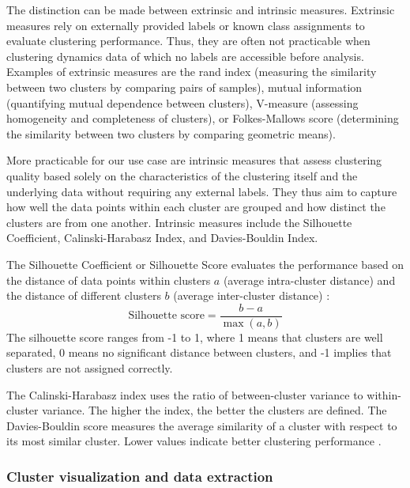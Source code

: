 \documentclass[9pt,bestpractices]{livecoms}
\begin{document}
The distinction can be made between extrinsic and intrinsic measures. Extrinsic measures rely on externally provided labels or known class assignments to evaluate clustering performance. Thus, they are often not practicable when clustering dynamics data of which no labels are accessible before analysis. Examples of extrinsic measures are the rand index (measuring the similarity between two clusters by comparing pairs of samples), mutual information (quantifying mutual dependence between clusters), V-measure (assessing homogeneity and completeness of clusters), or Folkes-Mallows score (determining the similarity between two clusters by comparing geometric means).

More practicable for our use case are intrinsic measures that assess clustering quality based solely on the characteristics of the clustering itself and the underlying data without requiring any external labels. They thus aim to capture how well the data points within each cluster are grouped and how distinct the clusters are from one another. Intrinsic measures include the Silhouette Coefficient, Calinski-Harabasz Index, and Davies-Bouldin Index.

The Silhouette Coefficient or Silhouette Score evaluates the performance based on the distance of data points within clusters $a$ (average intra-cluster distance) and the distance of different clusters $b$ (average inter-cluster distance) \cite{ROUSSEEUW198753}:
\begin{equation}
\label{eq:silhouette}
\text{Silhouette score} =  \frac{b-a}{\max(a,b)}
\end{equation}
The silhouette score ranges from -1 to 1, where 1 means that clusters are well separated, 0 means no significant distance between clusters, and -1 implies that clusters are not assigned correctly.

The Calinski-Harabasz index uses the ratio of between-cluster variance to within-cluster variance. The higher the index, the better the clusters are defined. The Davies-Bouldin score measures the average similarity of a cluster with respect to its most similar cluster. Lower values indicate better clustering performance \cite{RN148, RN17}.

\subsubsection{Cluster visualization and data extraction}
\end{document}
